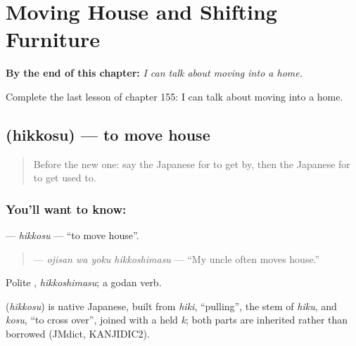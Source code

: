 
\chapter{Moving House and Shifting Furniture}
\label{ch:ja-moving-house-and-shifting-furniture}

\begin{chapteropening}
\textbf{By the end of this chapter:} \emph{I can talk about moving into a home.}

Complete the last lesson of chapter 155: I can talk about moving into a home.
\end{chapteropening}

\section[\texorpdfstring{\ja{ひっこす} (hikkosu)}{ひっこす (hikkosu)}]{ (hikkosu) — to move house}

\label{lesson:JA-C155-hikkosu}



\begin{quote}
Before the new one: say the Japanese for to get by, then the Japanese for to get used to.
\end{quote}

\subsection*{You'll want to know: }
\textbf{} — \emph{hikkosu} — \textquotedblleft{}to move house\textquotedblright{}.

\begin{quote}
\textbf{  } — \emph{ojisan wa yoku hikkoshimasu} — \textquotedblleft{}My uncle often moves house.\textquotedblright{}
\end{quote}

Polite \textbf{}, \emph{hikkoshimasu}; a godan verb.

\begin{cousinweb}
\textbf{} (\emph{hikkosu}) is native Japanese, built from \emph{hiki}, \textquotedblleft{}pulling\textquotedblright{}, the stem of \emph{hiku}, and \emph{kosu}, \textquotedblleft{}to cross over\textquotedblright{}, joined with a held \emph{k}; both parts are inherited rather than borrowed (JMdict, KANJIDIC2).
\end{cousinweb}


